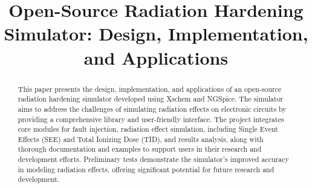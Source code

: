 \documentclass[conference]{IEEEtran}
\begin{document}
    \title{Open-Source Radiation Hardening Simulator: Design, Implementation, and Applications}

    \author{
        \and
        \and
        \and
    }

    \maketitle

    \begin{abstract}
        This paper presents the design, implementation, and applications of an open-source radiation hardening simulator developed using Xschem and NGSpice.
        The simulator aims to address the challenges of simulating radiation effects on electronic circuits by providing a comprehensive library and user-friendly interface.
        The project integrates core modules for fault injection, radiation effect simulation, including Single Event Effects (SEE) and Total Ionizing Dose (TID), and results analysis, along with thorough documentation and examples to support users in their research and development efforts.
        Preliminary tests demonstrate the simulator's improved accuracy in modeling radiation effects, offering significant potential for future research and development.
    \end{abstract}
\end{document}
